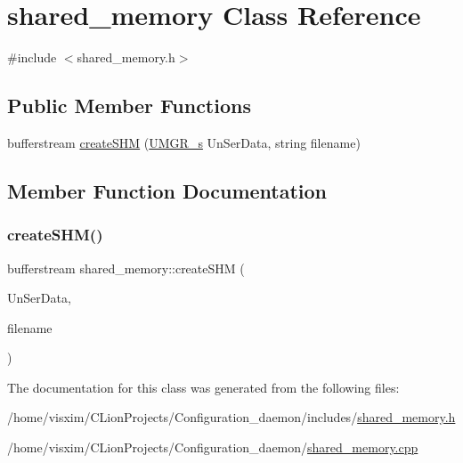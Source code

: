 \hypertarget{classshared__memory}{}\section{shared\+\_\+memory Class Reference}
\label{classshared__memory}


{\ttfamily \#include $<$shared\+\_\+memory.\+h$>$}

\subsection*{Public Member Functions}
\begin{DoxyCompactItemize}
\item 
bufferstream \hyperlink{classshared__memory_a63186cd2f439c25020c512a33d12e07f}{create\+S\+HM} (\hyperlink{structUMGR__s}{U\+M\+G\+R\+\_\+s} Un\+Ser\+Data, string filename)
\end{DoxyCompactItemize}


\subsection{Member Function Documentation}
\mbox{\label{classshared__memory_a63186cd2f439c25020c512a33d12e07f}} 
\subsubsection{\texorpdfstring{create\+S\+H\+M()}{createSHM()}}
{\footnotesize\ttfamily bufferstream shared\+\_\+memory\+::create\+S\+HM (\begin{DoxyParamCaption}\item[{\hyperlink{structUMGR__s}{U\+M\+G\+R\+\_\+s}}]{Un\+Ser\+Data,  }\item[{string}]{filename }\end{DoxyParamCaption})}



The documentation for this class was generated from the following files\+:\begin{DoxyCompactItemize}
\item 
/home/visxim/\+C\+Lion\+Projects/\+Configuration\+\_\+daemon/includes/\hyperlink{shared__memory_8h}{shared\+\_\+memory.\+h}\item 
/home/visxim/\+C\+Lion\+Projects/\+Configuration\+\_\+daemon/\hyperlink{shared__memory_8cpp}{shared\+\_\+memory.\+cpp}\end{DoxyCompactItemize}
